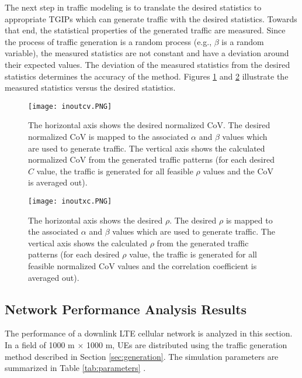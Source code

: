 \documentclass[journal]{IEEEtran}
\begin{document}
The next step in traffic modeling is to translate the desired statistics to appropriate TGIPs which can generate traffic with the desired statistics. Towards that end, the statistical properties of the generated traffic are measured. Since the process of traffic generation is a random process (e.g., $\beta$ is a random variable), the measured statistics are not constant and have a deviation around their expected values. The deviation of the measured statistics from the desired statistics determines the accuracy of the method. Figures \ref{fig:inoutcv} and \ref{fig:inoutxc} illustrate the measured statistics versus the desired statistics.

\begin{figure}
\centering
\texttt{[image: inoutcv.PNG]}
\caption{The horizontal axis shows the desired normalized CoV. The desired normalized CoV is mapped to the associated $\alpha$ and $\beta$ values which are used to generate traffic. The vertical axis shows the calculated normalized CoV from the generated traffic patterns (for each desired $C$ value, the traffic is generated for all feasible $\rho$ values and the CoV is averaged out).}
\label{fig:inoutcv}
\end{figure}

\begin{figure}
\centering
\texttt{[image: inoutxc.PNG]}
\caption{The horizontal axis shows the desired $\rho$. The desired $\rho$ is mapped to the associated $\alpha$ and $\beta$ values which are used to generate traffic. The vertical axis shows the calculated $\rho$ from the generated traffic patterns (for each desired $\rho$ value, the traffic is generated for all feasible normalized CoV values and the correlation coefficient is averaged out).}
\label{fig:inoutxc}
\end{figure}

\subsection{Network Performance Analysis Results}
\label{subsec:performanceresults}

The performance of a downlink LTE cellular network is analyzed in this section. In a field of 1000 m $\times$ 1000 m, UEs are distributed using the traffic generation method described in Section \ref{sec:generation}. The simulation parameters are summarized in Table \ref{tab:parameters} \cite{ICT10WINNER,DBNRS_PIMRC10}.
\end{document}
